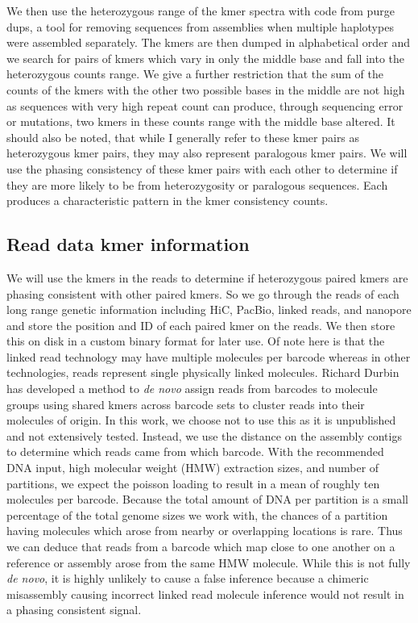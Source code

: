 \par{
We then use the heterozygous range of the kmer spectra with code from purge dups, a tool for removing sequences from assemblies when multiple haplotypes were assembled separately\cite{purgedups}. The kmers are then dumped in alphabetical order and we search for pairs of kmers which vary in only the middle base and fall into the heterozygous counts range. We give a further restriction that the sum of the counts of the kmers with the other two possible bases in the middle are not high as sequences with very high repeat count can produce, through sequencing error or mutations, two kmers in these counts range with the middle base altered. It should also be noted, that while I generally refer to these kmer pairs as heterozygous kmer pairs, they may also represent paralogous kmer pairs. We will use the phasing consistency of these kmer pairs with each other to determine if they are more likely to be from heterozygosity or paralogous sequences. Each produces a characteristic pattern in the kmer consistency counts.
}

\subsection{Read data kmer information}
\par{
We will use the kmers in the reads to determine if heterozygous paired kmers are phasing consistent with other paired kmers. So we go through the reads of each long range genetic information including HiC, PacBio, linked reads, and nanopore and store the position and ID of each paired kmer on the reads. We then store this on disk in a custom binary format for later use. Of note here is that the linked read technology may have multiple molecules per barcode whereas in other technologies, reads represent single physically linked molecules. Richard Durbin has developed a method to \textit{de novo} assign reads from barcodes to molecule groups using shared kmers across barcode sets to cluster reads into their molecules of origin. In this work, we choose not to use this as it is unpublished and not extensively tested. Instead, we use the distance on the assembly contigs to determine which reads came from which barcode. With the recommended DNA input, high molecular weight (HMW) extraction sizes, and number of partitions, we expect the poisson loading to result in a mean of roughly ten molecules per barcode. Because the total amount of DNA per partition is a small percentage of the total genome sizes we work with, the chances of a partition having molecules which arose from nearby or overlapping locations is rare. Thus we can deduce that reads from a barcode which map close to one another on a reference or assembly arose from the same HMW molecule. While this is not fully \textit{de novo}, it is highly unlikely to cause a false inference because a chimeric misassembly causing incorrect linked read molecule inference would not result in a phasing consistent signal.
}

